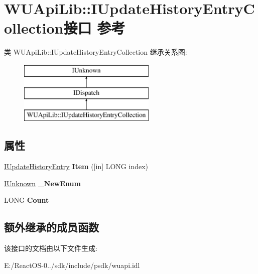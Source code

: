 \hypertarget{interface_w_u_api_lib_1_1_i_update_history_entry_collection}{}\section{W\+U\+Api\+Lib\+:\+:I\+Update\+History\+Entry\+Collection接口 参考}
\label{interface_w_u_api_lib_1_1_i_update_history_entry_collection}
类 W\+U\+Api\+Lib\+:\+:I\+Update\+History\+Entry\+Collection 继承关系图\+:\begin{figure}[H]
\begin{center}
\leavevmode
\includegraphics[height=3.000000cm]{interface_w_u_api_lib_1_1_i_update_history_entry_collection}
\end{center}
\end{figure}
\subsection*{属性}
\begin{DoxyCompactItemize}
\item 
\mbox{\label{interface_w_u_api_lib_1_1_i_update_history_entry_collection_ad8a12863e6c0ad24e8ff28063a8ef7f7}} 
\hyperlink{interface_w_u_api_lib_1_1_i_update_history_entry}{I\+Update\+History\+Entry} {\bfseries Item} (\mbox{[}in\mbox{]} L\+O\+NG index)
\item 
\mbox{\label{interface_w_u_api_lib_1_1_i_update_history_entry_collection_a254be1274460d32b2269943e8bc34049}} 
\hyperlink{interface_i_unknown}{I\+Unknown} {\bfseries \+\_\+\+New\+Enum}
\item 
\mbox{\label{interface_w_u_api_lib_1_1_i_update_history_entry_collection_a7e389e15003766a5e5684c329399b5d5}} 
L\+O\+NG {\bfseries Count}
\end{DoxyCompactItemize}
\subsection*{额外继承的成员函数}


该接口的文档由以下文件生成\+:\begin{DoxyCompactItemize}
\item 
E\+:/\+React\+O\+S-\/0../sdk/include/psdk/wuapi.\+idl\end{DoxyCompactItemize}
